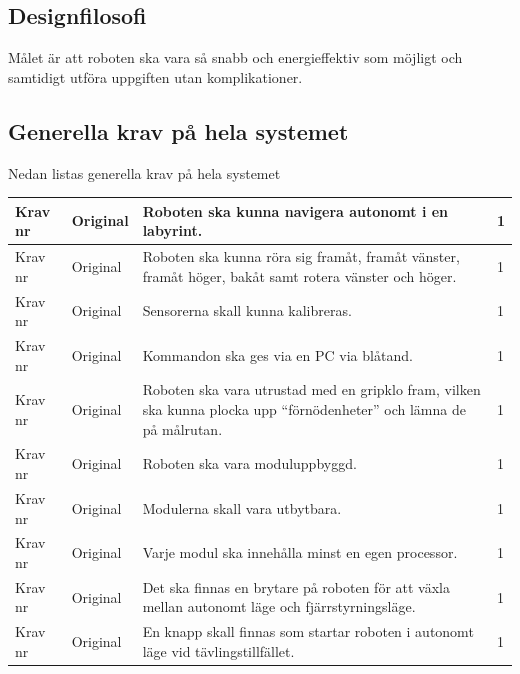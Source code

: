 \documentclass[11pt]{article}
\newcounter{kravc}
\newcommand{\kravcc}{
	\thekravc
	\stepcounter{kravc}
}
\begin{document}
\begin{flushleft}
\subsection{Designfilosofi}
Målet är att roboten ska vara så snabb och energieffektiv som möjligt och samtidigt utföra uppgiften utan komplikationer. 

\subsection{Generella krav på hela systemet}
Nedan listas generella krav på hela systemet
\\
\begin{center}
\begin{longtable}{|l|l|p{.70\linewidth}|l|} \hline

Krav nr\kravcc & 
Original & 
Roboten ska kunna navigera autonomt i en labyrint. & 
1 \\ \hline

Krav nr\kravcc & 
Original & 
Roboten ska kunna röra sig framåt, framåt vänster, framåt höger, bakåt samt rotera vänster och höger. & 
1 \\ \hline

Krav nr\kravcc &
Original &
Sensorerna skall kunna kalibreras. &
1 \\ \hline

Krav nr\kravcc &
Original &
Kommandon ska ges via en PC via blåtand. &
1 \\ \hline

Krav nr\kravcc &
Original &
Roboten ska vara utrustad med en gripklo fram, vilken ska kunna plocka upp “förnödenheter” och lämna de på målrutan. &
1 \\ \hline

Krav nr\kravcc &
Original &
Roboten ska vara moduluppbyggd. &
1 \\ \hline

Krav nr\kravcc &
Original &
Modulerna skall vara utbytbara. &
1 \\ \hline

Krav nr\kravcc &
Original &
Varje modul ska innehålla minst en egen processor. &
1 \\ \hline

Krav nr\kravcc &
Original &
Det ska finnas en brytare på roboten för att växla mellan autonomt läge och fjärrstyrningsläge. &
1 \\ \hline

Krav nr\kravcc &
Original &
En knapp skall finnas som startar roboten i autonomt läge vid tävlingstillfället. &
1 \\ \hline


\end{longtable}
\end{center}
\end{flushleft}
\end{document}
